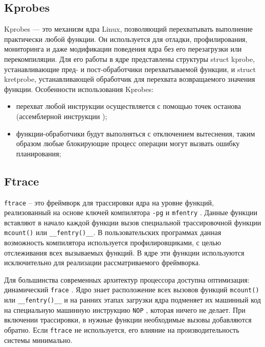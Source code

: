 \documentclass{bmstu}
\begin{document}
\subsection{Kprobes} %
Kprobes — это механизм ядра Linux, позволяющий перехватывать выполнение практически любой функции. Он используется для отладки, профилирования, мониторинга и даже модификации поведения ядра без его перезагрузки или перекомпиляции. Для его работы в ядре представлены структуры struct kprobe, устанавливающие пред- и пост-обработчики перехватываемой функции, и struct kretprobe, устанавливающей обработчик для перехвата возвращаемого значения функции. %
Особенности использования Kprobes:
\begin{itemize}
	\item перехват любой инструкции осуществляется с помощью точек останова (ассемблерной инструкции );
	\item функции-обработчики будут выполняться с отключением вытеснения, таким образом любые блокирующие процесс операции могут вызвать ошибку планирования;
\end{itemize}


\subsection{Ftrace}%
\texttt{ftrace} \cite{ftrace} -- это фреймворк для трассировки ядра на уровне функций, реализованный на основе ключей компилятора \texttt{-pg} \cite{ftrace-habr} и \texttt{mfentry} \cite{ftrace-habr}. Данные функции вставляют в начало каждой функции вызов специальной трассировочной функции \texttt{mcount()} или \texttt{\_\_fentry()\_\_}. В пользовательских программах данная возможность компилятора используется профилировщиками, с целью отслеживания всех вызываемых функций. В ядре эти функции используются исключительно для реализации рассматриваемого фреймворка.

Для большинства современных архитектур процессора доступна оптимизация: динамический \texttt{frace} \cite{ftrace-habr}. Ядро знает расположение всех вызовов функций \texttt{mcount()} или \texttt{\_\_fentry()\_\_} и на ранних этапах загрузки ядра подменяет их машинный код на специальную машинную инструкцию \texttt{NOP} \cite{NOP}, которая ничего не делает. При включении трассировки, в нужные функции необходимые вызовы добавляются обратно. Если \texttt{ftrace} не используется, его влияние на производительность системы минимально.
\end{document}
